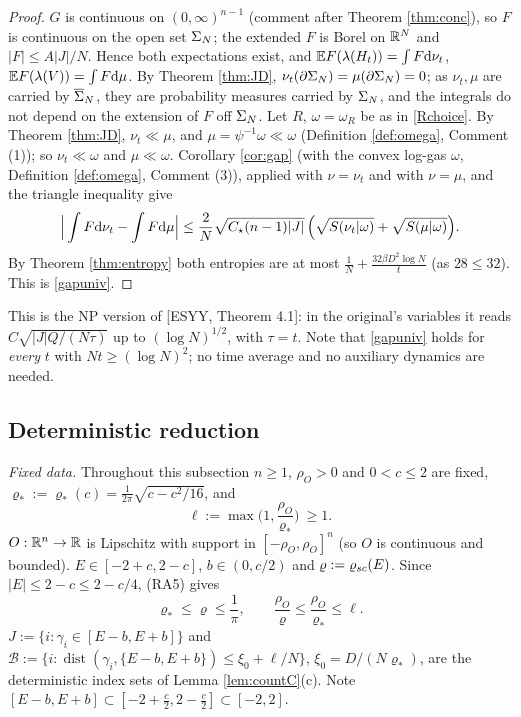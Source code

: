 \begin{proof}
$G$ is continuous on $(0,\infty)^{n-1}$ (comment after Theorem \ref{thm:conc}), so $F$ is continuous on the open set $\Sigma_N$; the extended $F$ is Borel on $\mathbb{R}^N$ and $|F|\le A|J|/N$. Hence both expectations exist, and $\mathbb{E} F(\lambda(H_t))=\int F\mathrm{d}\nu_t$, $\mathbb{E} F(\lambda(V))=\int F\mathrm{d}\mu$.
By Theorem \ref{thm:JD}, $\nu_t(\partial\Sigma_N)=\mu(\partial\Sigma_N)=0$; as $\nu_t,\mu$ are carried by $\overline{\Sigma}_N$, they are probability measures carried by $\Sigma_N$, and the integrals do not depend on the extension of $F$ off $\Sigma_N$.
Let $R$, $\omega=\omega_R$ be as in \eqref{Rchoice}. By Theorem \ref{thm:JD}, $\nu_t\ll\mu$, and $\mu=\psi^{-1}\omega\ll\omega$ (Definition \ref{def:omega}, Comment (1)); so $\nu_t\ll\omega$ and $\mu\ll\omega$.
Corollary \ref{cor:gap} (with the convex log-gas $\omega$, Definition \ref{def:omega}, Comment (3)), applied with $\nu=\nu_t$ and with $\nu=\mu$, and the triangle inequality give
\[
\Big|\int F\mathrm{d}\nu_t-\int F\mathrm{d}\mu\Big|\le\frac2N\sqrt{C_\star(n-1)|J|}\,\Big(\sqrt{S(\nu_t|\omega)}+\sqrt{S(\mu|\omega)}\Big).
\]
By Theorem \ref{thm:entropy} both entropies are at most $\frac1N+\frac{32\beta D^2\log N}t$ (as $28\le32$). This is \eqref{gapuniv}.
\end{proof}

\noindent This is the NP version of [ESYY, Theorem 4.1]: in the original's variables it reads $C\sqrt{|J|Q/(N\tau)}$ up to $(\log N)^{1/2}$, with $\tau=t$. Note that \eqref{gapuniv} holds for \emph{every} $t$ with $Nt\ge(\log N)^2$; no time average and no auxiliary dynamics are needed.

\subsection{Deterministic reduction}\label{ss:reduction}

\noindent\emph{Fixed data.} Throughout this subsection $n\ge1$, $\rho_O>0$ and $0<c\le2$ are fixed, $\varrho_*:=\varrho_*(c)=\frac1{2\pi}\sqrt{c-c^2/16}$, and
\[
\ell:=\max\Big(1,\frac{\rho_O}{\varrho_*}\Big)\ \ge1 .
\]
$O:\mathbb{R}^n\to\mathbb{R}$ is Lipschitz with support in $[-\rho_O,\rho_O]^n$ (so $O$ is continuous and bounded). $E\in[-2+c,2-c]$, $b\in(0,c/2)$ and $\varrho:=\varrho_{sc}(E)$. Since $|E|\le2-c\le2-c/4$, (RA5) gives
\begin{equation}\label{c8:rho}
\varrho_*\le\varrho\le\frac1\pi,\qquad\frac{\rho_O}{\varrho}\le\frac{\rho_O}{\varrho_*}\le\ell .
\end{equation}
$J:=\{i:\gamma_i\in[E-b,E+b]\}$ and $\mathcal B:=\{i:\operatorname{dist}(\gamma_i,\{E-b,E+b\})\le\xi_0+\ell/N\}$, $\xi_0=D/(N\varrho_*)$, are the deterministic index sets of Lemma \ref{lem:countC}(c).
Note $[E-b,E+b]\subset[-2+\frac c2,2-\frac c2]\subset[-2,2]$.

